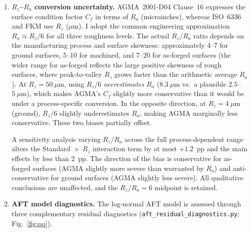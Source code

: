 \documentclass[twocolumn,12pt,a4paper]{article}
\begin{document}
\begin{enumerate}
        ($\approx 0.907$) because the formula is validated only up to
        40~$\mu$m; FKM clamps $K_{F\sigma}$ at 0.55; AGMA's $C_f$
        follows a smooth log-log form without a roughness cap. This
        asymmetry means that at $R_z=50~\mu$m, the ISO--FKM divergence
        is \emph{understated}: ISO's penalty is frozen at the
        $R_z=40~\mu$m value while FKM's and AGMA's penalties continue
        to increase with roughness. The Standard~$\times$~$R_z$
        interaction term (1.2\%) is therefore a conservative estimate
        of the true interaction at high roughness. Removing the ISO cap
        changes the interaction by $+0.3$~pp and leaves the main
        effects within 1~pp of baseline. The cap is retained in the
        main analysis because it reflects the standard's documented
        validity range; readers should note that the ISO-to-FKM gap at
        $R_z=50~\mu$m would be larger under an extrapolated ISO formula.
  \item \textbf{$R_z$--$R_a$ conversion uncertainty.} AGMA~2001-D04
        Clause~16 expresses the surface condition factor $C_f$ in terms
        of $R_a$ (microinches), whereas ISO~6336 and FKM use $R_z$
        ($\mu$m). I adopt the common engineering approximation
        $R_a \approx R_z/6$ for all three roughness levels. The actual
        $R_z/R_a$ ratio depends on the manufacturing process and surface
        skewness: approximately 4--7 for ground surfaces, 5--10 for
        machined, and 7--20 for as-forged surfaces (the wider range for
        as-forged reflects the large positive skewness of rough
        surfaces, where peak-to-valley $R_z$ grows faster than the
        arithmetic average $R_a$). At $R_z=50~\mu$m, using $R_z/6$
        \emph{overestimates} $R_a$ ($8.3~\mu$m vs.\ a plausible
        $2.5$--$5~\mu$m), which makes AGMA's $C_f$ slightly more
        conservative than it would be under a process-specific
        conversion. In the opposite direction, at $R_z=4~\mu$m
        (ground), $R_z/6$ slightly underestimates $R_a$, making AGMA
        marginally less conservative. These two biases partially offset.

        A sensitivity analysis varying $R_z/R_a$ across the full
        process-dependent range alters the
        Standard~$\times$~$R_z$ interaction term by at most $+1.2$~pp
        and the main effects by less than 2~pp. The direction of
        the bias is conservative for as-forged surfaces
        (AGMA slightly more severe than warranted by $R_a$) and
        anti-conservative for ground surfaces (AGMA slightly less
        severe). All qualitative conclusions are unaffected, and the
        $R_z/R_a=6$ midpoint is retained.
  \item \textbf{AFT model diagnostics.} The log-normal AFT model is
        assessed through three complementary residual diagnostics
        (\texttt{aft\_residual\_diagnostics.py}; Fig.~\ref{fig:qq}).


\end{enumerate}
\end{document}
